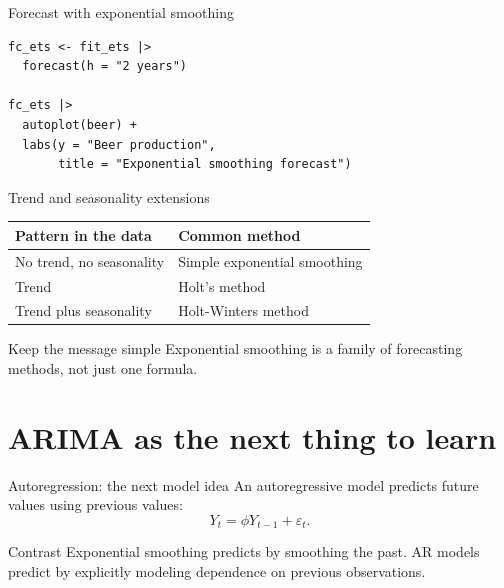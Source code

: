 \documentclass[aspectratio=169,11pt]{beamer}
\begin{document}
\begin{frame}[fragile]{Forecast with exponential smoothing}
\begin{lstlisting}
fc_ets <- fit_ets |>
  forecast(h = "2 years")

fc_ets |>
  autoplot(beer) +
  labs(y = "Beer production",
       title = "Exponential smoothing forecast")
\end{lstlisting}

\end{frame}

\begin{frame}{Trend and seasonality extensions}
\begin{center}
\begin{tabular}{ll}
\toprule
Pattern in the data & Common method \\
\midrule
No trend, no seasonality & Simple exponential smoothing \\
Trend & Holt's method \\
Trend plus seasonality & Holt-Winters method \\
\bottomrule
\end{tabular}
\end{center}

\vspace{0.4cm}
\begin{block}{Keep the message simple}
Exponential smoothing is a family of forecasting methods, not just one formula.
\end{block}
\end{frame}

\section{ARIMA as the next thing to learn}

\begin{frame}{Autoregression: the next model idea}
An autoregressive model predicts future values using previous values:
\[
Y_t = \phi Y_{t-1} + \varepsilon_t.
\]

\vspace{0.4cm}
\begin{block}{Contrast}
Exponential smoothing predicts by smoothing the past. AR models predict by explicitly modeling dependence on previous observations.
\end{block}
\end{frame}
\end{document}
